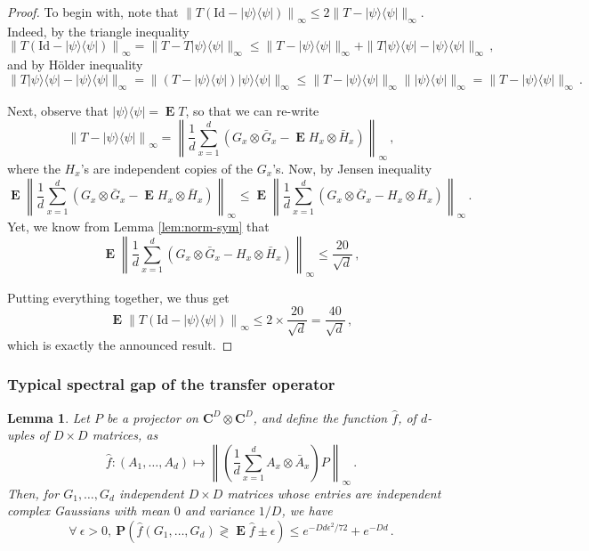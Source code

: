 \documentclass{amsart}
\newtheorem{lemma}[theorem]{Lemma}
\newcommand{\C}{\mathbf{C}}
\renewcommand{\P}{\mathbf{P}}
\renewcommand{\leq}{\leqslant}
\newcommand{\Id}{\mathrm{Id}}
\DeclareMathOperator{\E}{\mathbf{E}}
\newcommand{\ketbra}[2]{| #1 \rangle\!\langle #2 |}
\begin{document}
\begin{proof}
    To begin with, note that $\left\|T(\Id-\ketbra{\psi}{\psi})\right\|_{\infty} \leq 2 \|T-\ketbra{\psi}{\psi}\|_{\infty}$. Indeed, by the triangle inequality
    \[ \left\|T(\Id-\ketbra{\psi}{\psi})\right\|_{\infty} = \|T-T\ketbra{\psi}{\psi}\|_{\infty} \leq \|T-\ketbra{\psi}{\psi}\|_{\infty} + \|T\ketbra{\psi}{\psi}-\ketbra{\psi}{\psi}\|_{\infty} \, , \]
    and by H\"{o}lder inequality
    \[ \|T\ketbra{\psi}{\psi}-\ketbra{\psi}{\psi}\|_{\infty} = \|(T-\ketbra{\psi}{\psi})\ketbra{\psi}{\psi}\|_{\infty} \leq \|T-\ketbra{\psi}{\psi}\|_{\infty}\|\ketbra{\psi}{\psi}\|_{\infty} = \|T-\ketbra{\psi}{\psi}\|_{\infty} \, . \]

    Next, observe that $\ketbra{\psi}{\psi}=\E T$, so that we can re-write
    \[ \left\| T-\ketbra{\psi}{\psi} \right\|_{\infty} = \left\| \frac{1}{d} \sum_{x=1}^d \left(G_x \otimes \bar{G}_x - \E H_x \otimes \bar{H}_x \right) \right\|_{\infty} \, , \]
    where the $H_x$'s are independent copies of the $G_x$'s. Now, by Jensen inequality
    \[  \E \left\| \frac{1}{d} \sum_{x=1}^d \left(G_x \otimes \bar{G}_x - \E H_x \otimes \bar{H}_x \right) \right\|_{\infty} \leq \E \left\| \frac{1}{d} \sum_{x=1}^d (G_x \otimes \bar{G}_x - H_x \otimes \bar{H}_x) \right\|_{\infty} \, . \]
    Yet, we know from Lemma \ref{lem:norm-sym} that
    \[ \E \left\| \frac{1}{d} \sum_{x=1}^d (G_x \otimes \bar{G}_x - H_x \otimes \bar{H}_x) \right\|_{\infty} \leq \frac{20}{\sqrt{d}} \, , \]

    Putting everything together, we thus get
    \[ \E \left\|T(\Id-\ketbra{\psi}{\psi})\right\|_{\infty} \leq 2\times\frac{20}{\sqrt{d}}= \frac{40}{\sqrt{d}} \, , \]
    which is exactly the announced result.
\end{proof}

\subsubsection{Typical spectral gap of the transfer operator} \hfill\par\smallskip

\begin{lemma} \label{lem:dev-ineq}
    Let $P$ be a projector on $\C^D\otimes\C^D$, and define the function $\hat{f}$, of $d$-uples of $D\times D$ matrices, as
    \[ \hat{f}:(A_1,\ldots,A_d) \mapsto \left\|\left(\frac{1}{d}\sum_{x=1}^dA_x\otimes\bar{A}_x\right)P\right\|_{\infty} \, . \]
    Then, for $G_1,\ldots,G_d$ independent $D\times D$ matrices whose entries are independent complex Gaussians with mean $0$ and variance $1/D$, we have
    \[ \forall\ \epsilon>0,\ \P\left( \hat{f}(G_1,\ldots,G_d) \gtrless \E \hat{f} \pm \epsilon \right) \leq e^{-Dd\epsilon^2/72}+e^{-Dd} \, . \]
\end{lemma}
\end{document}
